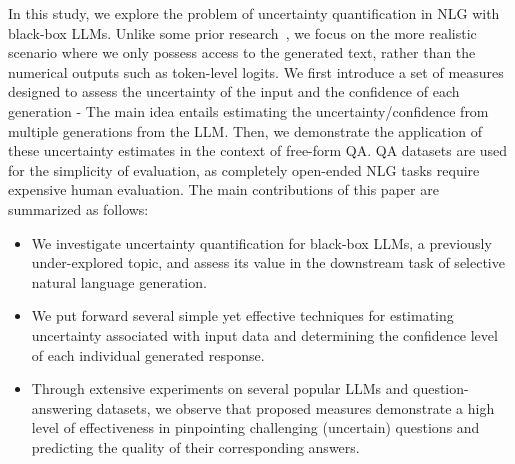 In this study, we explore the problem of uncertainty quantification in NLG with black-box LLMs. 
Unlike some prior research~\citep{DBLP:journals/corr/abs-2012-14983,Lin2022TeachingMT,kadavath2022language,kuhn2023semantic}, we focus on the more realistic scenario where we only possess access to the generated text, rather than the numerical outputs such as token-level logits. 
We first introduce a set of measures designed to assess the uncertainty of the input and the confidence of each generation -  
The main idea entails estimating the uncertainty/confidence from multiple generations from the LLM. 
Then, we demonstrate the application of these uncertainty estimates in the context of free-form QA.
QA datasets are used for the simplicity of evaluation, as completely open-ended NLG tasks require expensive human evaluation.
The main contributions of this paper are summarized as follows:
\begin{itemize}
    \item We investigate uncertainty quantification for black-box LLMs, a previously under-explored topic, and assess its value in the downstream task of selective natural language generation. 
    \item We put forward several simple yet effective techniques for estimating uncertainty associated with input data and determining the confidence level of each individual generated response.
    \item Through extensive experiments on several popular LLMs and question-answering datasets, we observe that proposed measures demonstrate a high level of effectiveness in pinpointing challenging (uncertain) questions and predicting the quality of their corresponding answers.
\end{itemize}

